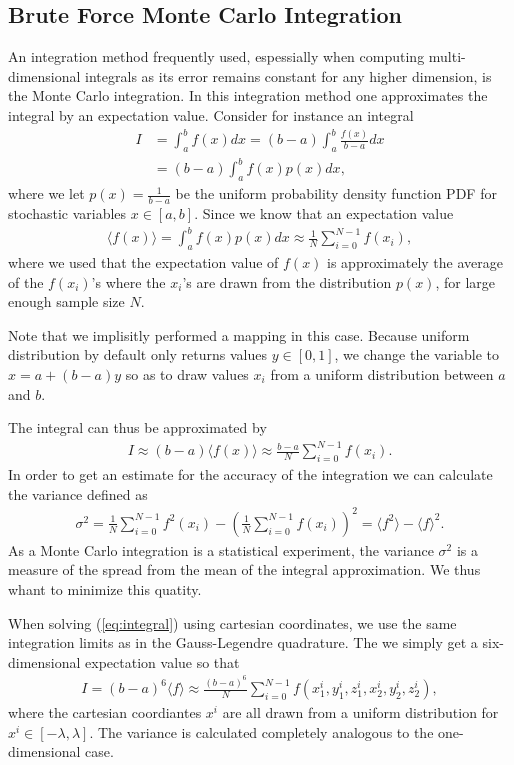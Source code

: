 \documentclass[twocolumn]{aastex62}
\begin{document}
\subsection{Brute Force Monte Carlo Integration}
An integration method frequently used, espessially when computing multi-dimensional integrals as its error remains constant for any higher dimension, is the Monte Carlo integration. In this integration method one approximates the integral by an expectation value. Consider for instance an integral 
\begin{align}
	I &= \int^b_a f(x)dx = (b-a)\int^b_a\frac{f(x)}{b-a}dx \\	
	&= (b-a)\int^b_af(x)p(x)dx,
\end{align}
where we let $p(x) = \frac{1}{b-a}$ be the uniform probability density function PDF for stochastic variables $x\in[a, b]$. Since we know that an expectation value 
\begin{align}
	\langle f(x)\rangle = \int^b_a f(x)p(x)dx \approx \frac{1}{N}\sum_{i=0}^{N-1} f(x_i),
\end{align}
where we used that the expectation value of $f(x)$ is approximately the average of the $f(x_i)$'s where the $x_i$'s are drawn from the distribution $p(x)$, for large enough sample size $N$. 

Note that we implisitly performed a mapping in this case. Because uniform distribution by default only returns values $y\in[0, 1]$, we change the variable to $x = a + (b-a)y$ so as to draw values $x_i$ from a uniform distribution between $a$ and $b$. 

The integral can thus be approximated by 
\begin{align}
	I \approx (b-a)\langle f(x) \rangle \approx \frac{b-a}{N}\sum^{N-1}_{i=0}f(x_i).
\end{align}
In order to get an estimate for the accuracy of the integration we can calculate the variance defined as 
\begin{align}
	\sigma^2 = \frac{1}{N}\sum_{i=0}^{N-1} f^2(x_i) - \left(\frac{1}{N}\sum_{i=0}^{N-1}f(x_i)\right)^2 = \langle f^2\rangle - \langle f\rangle^2.
\end{align}
As a Monte Carlo integration is a statistical experiment, the variance $\sigma^2$ is a measure of the spread from the mean of the integral approximation. We thus whant to minimize this quatity.

When solving (\ref{eq:integral}) using cartesian coordinates, we use the same integration limits as in the Gauss-Legendre quadrature. The we simply get a six-dimensional expectation value so that 
\begin{align}
	I = (b-a)^6\langle f \rangle \approx \frac{(b-a)^6}{N}\sum^{N-1}_{i=0} f(x_1^i, y_1^i, z_1^i, x_2^i, y_2^i, z_2^i),
\end{align}
where the cartesian coordiantes $x^i$ are all drawn from a uniform distribution for $x^i\in[-\lambda, \lambda]$. The variance is calculated completely analogous to the one-dimensional case. 
\end{document}

